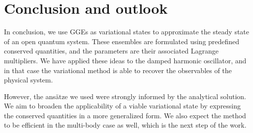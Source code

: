 \section{Conclusion and outlook}


In conclusion, we use GGEs as variational states to approximate the steady state of an open quantum system. 
These ensembles are formulated using predefined conserved quantities, and the parameters are their associated Lagrange multipliers.
We have applied these ideas to the damped harmonic oscillator, and in that case the variational method is able to recover the observables of the physical system.

However, the ansätze we used were strongly informed by the analytical solution. We aim to broaden the applicability of a viable variational state by expressing the conserved quantities in a more generalized form.
We also expect the method to be efficient in the multi-body case as well, which is the next step of the work.
